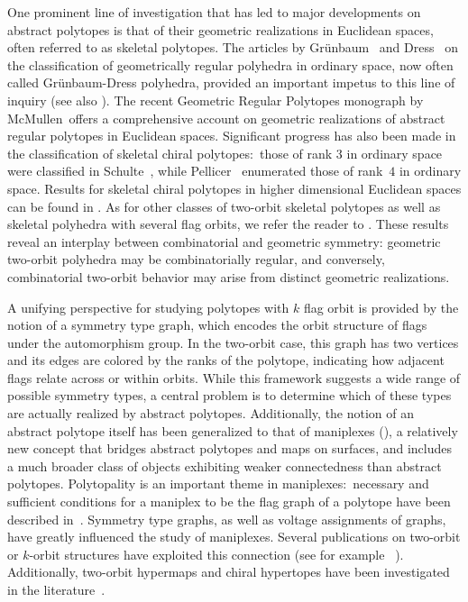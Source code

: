 \documentclass[12pt]{article}
\renewcommand{\>}{\rangle}
\theoremstyle{definition}\newtheorem{definition}{Definition}[section]
\begin{document}
One prominent line of investigation that has led to major developments on abstract polytopes is that of their geometric realizations in Euclidean spaces, often referred to as skeletal polytopes. 
The articles by Gr\"unbaum~\cite{G1977a} and Dress~\cite{D1981,D1985} on the classification of geometrically regular polyhedra in ordinary space, now often called Gr\"unbaum-Dress polyhedra, provided an important impetus to this line of inquiry (see also \cite{MS1997}). 
{The recent Geometric Regular Polytopes monograph by McMullen~\cite{Mc2020}offers a comprehensive account on geometric realizations of abstract regular polytopes in Euclidean spaces.} Significant progress has { also} been made in the classification of skeletal chiral polytopes:\ 
those of rank $3$ in ordinary space were classified  { in Schulte~\cite{S2004,S2005}, while Pellicer~\cite{P2017} enumerated those of rank~$4$ in ordinary space}. Results for skeletal chiral polytopes in higher dimensional Euclidean spaces can be found in \cite{BG-CH2027, BHP2014, BHP2016, BHP2021, HT2026+, Pe2016, P2017, P2021, Pe2021, P2025, PWe2010}.
 As for other classes of two-orbit skeletal polytopes as well as skeletal polyhedra with several flag orbits, we refer the reader to \cite{BHP2016, CP2023, CP2024, HGV,    Ma2016a, Ma2016b, Mc2021, P2016, PWi2023, PWi2026+, SW2020}. 
These results reveal an interplay between combinatorial and geometric symmetry: geometric two-orbit polyhedra may be combinatorially regular, and conversely, combinatorial two-orbit behavior may arise from distinct geometric realizations.

A unifying perspective for studying polytopes with $k$ flag orbit is provided by the notion of a symmetry type graph, which encodes the orbit structure of flags under the automorphism group. 
In the two-orbit case, this graph has two vertices {and its edges are} colored by the ranks of the polytope, indicating how adjacent flags relate across or within orbits. 
While this framework suggests a wide range of possible symmetry types, a central problem is to determine which of these types are actually realized by abstract polytopes.
Additionally, the notion of an abstract polytope itself has been generalized to that of maniplexes (\cite{W2012}), a relatively new concept that bridges abstract polytopes and maps on surfaces,
and includes a much broader class of objects exhibiting weaker connectedness than abstract polytopes. { Polytopality is an important theme in maniplexes:\ 
necessary and sufficient conditions for a maniplex} to be the flag graph of a polytope have been described in~\cite{GVH2018}. {Symmetry type graphs, as well as voltage assignments of graphs, have greatly influenced the study of maniplexes.} 
Several publications on two-orbit or $k$-orbit structures { have exploited this connection %
(see for example ~\cite{CRHT2015,CP2018,HM2022,HM2023, Mo2021,Mo2024}).
Additionally, two-orbit hypermaps and chiral hypertopes have been investigated in the literature~\cite{ruiphd,FLW2016}.}
\end{document}
